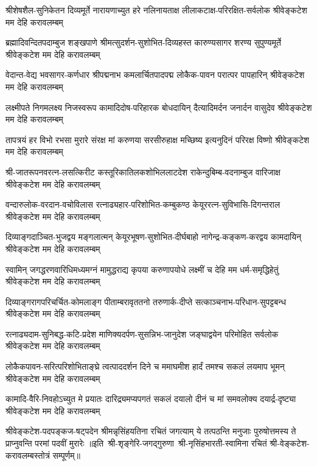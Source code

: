 \fourlineindentedshloka
{श्रीशेषशैल-सुनिकेतन दिव्यमूर्ते}
{नारायणाच्युत हरे नलिनायताक्ष}
{लीलाकटाक्ष-परिरक्षित-सर्वलोक}
{श्रीवेङ्कटेश मम देहि करावलम्बम्}

\fourlineindentedshloka
{ब्रह्मादिवन्दितपदाम्बुज शङ्खपाणे}
{श्रीमत्सुदर्शन-सुशोभित-दिव्यहस्त}
{कारुण्यसागर शरण्य सुपुण्यमूर्ते}
{श्रीवेङ्कटेश मम देहि करावलम्बम्}

\fourlineindentedshloka
{वेदान्त-वेद्य भवसागर-कर्णधार}
{श्रीपद्मनाभ कमलार्चितपादपद्म}
{लोकैक-पावन परात्पर पापहारिन्}
{श्रीवेङ्कटेश मम देहि करावलम्बम्}

\fourlineindentedshloka
{लक्ष्मीपते निगमलक्ष्य निजस्वरूप}
{कामादिदोष-परिहारक बोधदायिन्}
{दैत्यादिमर्दन जनार्दन वासुदेव}
{श्रीवेङ्कटेश मम देहि करावलम्बम्}

\fourlineindentedshloka
{तापत्रयं हर विभो रभसा मुरारे}
{संरक्ष मां करुणया सरसीरुहाक्ष}
{मच्छिष्य इत्यनुदिनं परिरक्ष विष्णो}
{श्रीवेङ्कटेश मम देहि करावलम्बम्}

\fourlineindentedshloka
{श्री-जातरूपनवरत्न-लसत्किरीट}
{कस्तूरिकातिलकशोभिललाटदेश}
{राकेन्दुबिम्ब-वदनाम्बुज वारिजाक्ष}
{श्रीवेङ्कटेश मम देहि करावलम्बम्}

\fourlineindentedshloka
{वन्दारुलोक-वरदान-वचोविलास}
{रत्नाढ्यहार-परिशोभित-कम्बुकण्ठ}
{केयूररत्न-सुविभासि-दिगन्तराल}
{श्रीवेङ्कटेश मम देहि करावलम्बम्}

\fourlineindentedshloka
{दिव्याङ्गदाञ्चित-भुजद्वय मङ्गलात्मन्}
{केयूरभूषण-सुशोभित-दीर्घबाहो}
{नागेन्द्र-कङ्कण-करद्वय कामदायिन्}
{श्रीवेङ्कटेश मम देहि करावलम्बम्}

\fourlineindentedshloka
{स्वामिन् जगद्धरणवारिधिमध्यमग्नं}
{मामुद्धराद्य कृपया करुणापयोधे}
{लक्ष्मीं च देहि मम धर्म-समृद्धिहेतुं}
{श्रीवेङ्कटेश मम देहि करावलम्बम्}

\fourlineindentedshloka
{दिव्याङ्गरागपरिचर्चित-कोमलाङ्ग}
{पीताम्बरावृततनो तरुणार्क-दीप्ते}
{सत्काञ्चनाभ-परिधान-सुपट्टबन्ध}
{श्रीवेङ्कटेश मम देहि करावलम्बम्}

\fourlineindentedshloka
{रत्नाढ्यदाम-सुनिबद्ध-कटि-प्रदेश}
{माणिक्यदर्पण-सुसन्निभ-जानुदेश}
{जङ्घाद्वयेन परिमोहित सर्वलोक}
{श्रीवेङ्कटेश मम देहि करावलम्बम्}

\fourlineindentedshloka
{लोकैकपावन-सरित्परिशोभिताङ्घ्रे}
{त्वत्पाददर्शन दिने च ममाघमीश}
{हार्दं तमश्च सकलं लयमाप भूमन्}
{श्रीवेङ्कटेश मम देहि करावलम्बम्}

\fourlineindentedshloka
{कामादि-वैरि-निवहोऽच्युत मे प्रयातः}
{दारिद्र्यमप्यपगतं सकलं दयालो}
{दीनं च मां समवलोक्य दयार्द्र-दृष्ट्या}
{श्रीवेङ्कटेश मम देहि करावलम्बम्}

\fourlineindentedshloka
{श्रीवेङ्कटेश-पदपङ्कज-षट्पदेन}
{श्रीमन्नृसिंहयतिना रचितं जगत्याम्}
{ये तत्पठन्ति मनुजाः पुरुषोत्तमस्य}
{ते प्राप्नुवन्ति परमां पदवीं मुरारेः}
॥इति~श्री-शृङ्गेरि-जगद्गुरुणा~श्री-नृसिंहभारती-स्वामिना रचितं श्री-वेङ्कटेश-करावलम्बस्तोत्रं सम्पूर्णम्॥